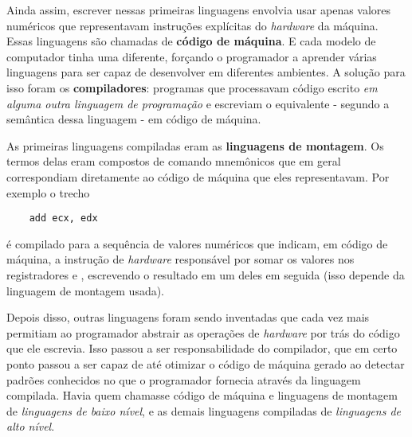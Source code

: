   Ainda assim, escrever nessas primeiras linguagens envolvia usar apenas valores
  numéricos que representavam instruções explícitas do \emph{hardware} da
  máquina. Essas linguagens são chamadas de \textbf{código de máquina}. E cada
  modelo de computador tinha uma diferente, forçando o programador a aprender
  várias linguagens para ser capaz de desenvolver em diferentes ambientes. A
  solução para isso foram os \textbf{compiladores}: programas que processavam
  código escrito \emph{em alguma outra linguagem de programação} e escreviam
  o equivalente - segundo a semântica dessa linguagem - em código de máquina.


  As primeiras linguagens compiladas eram as \textbf{linguagens de montagem}. Os
  termos delas eram compostos de comando mnemônicos que em geral correspondiam
  diretamente ao código de máquina que eles representavam. Por exemplo o trecho

  \begin{verbatim}
    add ecx, edx\end{verbatim}

  \hspace{-16pt}é compilado para a sequência de valores numéricos que indicam,
  em código de máquina, a instrução de \emph{hardware} responsável por somar os
  valores nos registradores  e , escrevendo o resultado em
  um deles em seguida (isso depende da linguagem de montagem usada).

  Depois disso, outras linguagens foram sendo inventadas que cada vez mais
  permitiam ao programador abstrair as operações de \emph{hardware} por trás
  do código que ele escrevia. Isso passou a ser responsabilidade do compilador,
  que em certo ponto passou a ser capaz de até otimizar o código de máquina
  gerado ao detectar padrões conhecidos no que o programador fornecia através
  da linguagem compilada. Havia quem chamasse código de máquina e linguagens de
  montagem de \emph{linguagens de baixo nível}, e as demais linguagens
  compiladas de \emph{linguagens de alto nível}.

